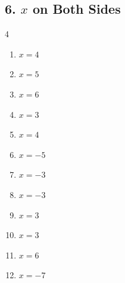 \documentclass[12pt,a4paper]{article}
\begin{document}
\subsection*{6. $x$ on Both Sides}
\begin{multicols}{4}\begin{enumerate}[nosep, label=\arabic*., start=1]
\item $x = 4$
\item $x = 5$
\item $x = 6$
\item $x = 3$
\item $x = 4$
\item $x = -5$
\item $x = -3$
\item $x = -3$
\item $x = 3$
\item $x = 3$
\item $x = 6$
\item $x = -7$
\end{enumerate}\end{multicols}
\end{document}
